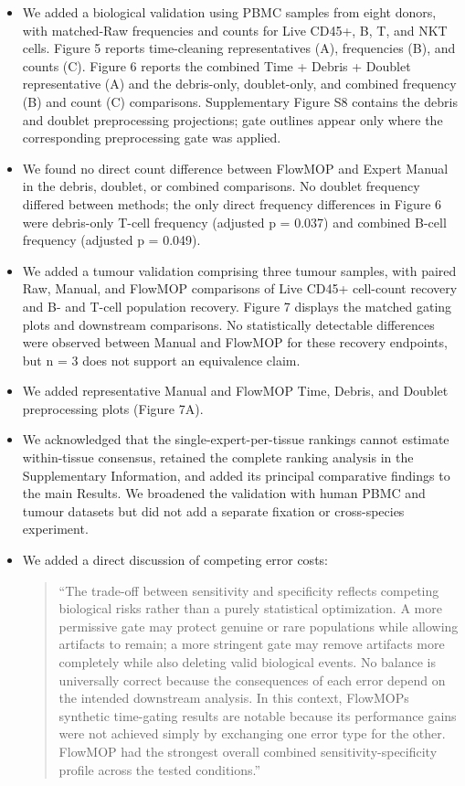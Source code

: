\documentclass[
  11pt,
  a4paper,
]{article}
\begin{document}
\begin{itemize}
\item
  We added a biological validation using PBMC samples from eight donors,
  with matched-Raw frequencies and counts for Live CD45+, B, T, and NKT
  cells. Figure 5 reports time-cleaning representatives (A), frequencies
  (B), and counts (C). Figure 6 reports the combined Time + Debris +
  Doublet representative (A) and the debris-only, doublet-only, and
  combined frequency (B) and count (C) comparisons. Supplementary Figure
  S8 contains the debris and doublet preprocessing projections; gate
  outlines appear only where the corresponding preprocessing gate was
  applied.
\item
  We found no direct count difference between FlowMOP and Expert Manual
  in the debris, doublet, or combined comparisons. No doublet frequency
  differed between methods; the only direct frequency differences in
  Figure 6 were debris-only T-cell frequency (adjusted p = 0.037) and
  combined B-cell frequency (adjusted p = 0.049).
\item
  We added a tumour validation comprising three tumour samples, with
  paired Raw, Manual, and FlowMOP comparisons of Live CD45+ cell-count
  recovery and B- and T-cell population recovery. Figure 7 displays the
  matched gating plots and downstream comparisons. No statistically
  detectable differences were observed between Manual and FlowMOP for
  these recovery endpoints, but n = 3 does not support an equivalence
  claim.
\item
  We added representative Manual and FlowMOP Time, Debris, and Doublet
  preprocessing plots (Figure 7A).
\item
  We acknowledged that the single-expert-per-tissue rankings cannot
  estimate within-tissue consensus, retained the complete ranking
  analysis in the Supplementary Information, and added its principal
  comparative findings to the main Results. We broadened the validation
  with human PBMC and tumour datasets but did not add a separate
  fixation or cross-species experiment.
\item
  We added a direct discussion of competing error costs:

  \begin{quote}
  ``The trade-off between sensitivity and specificity reflects competing
  biological risks rather than a purely statistical optimization. A more
  permissive gate may protect genuine or rare populations while allowing
  artifacts to remain; a more stringent gate may remove artifacts more
  completely while also deleting valid biological events. No balance is
  universally correct because the consequences of each error depend on
  the intended downstream analysis. In this context,
  FlowMOP\textquotesingle s synthetic time-gating results are notable
  because its performance gains were not achieved simply by exchanging
  one error type for the other. FlowMOP had the strongest overall
  combined sensitivity-specificity profile across the tested
  conditions.''
  \end{quote}
\end{itemize}
\end{document}
